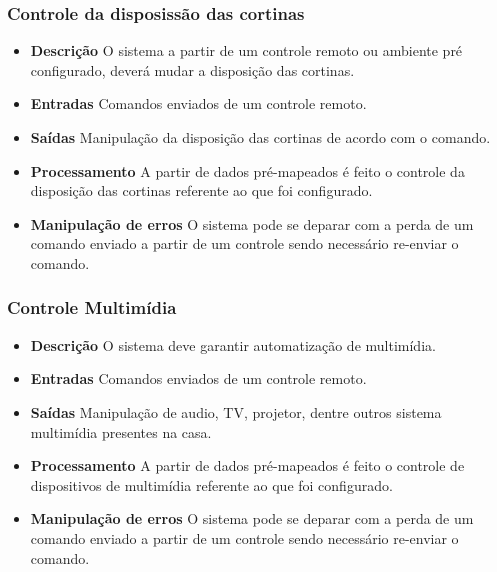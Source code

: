 \subsubsection{Controle da disposissão das cortinas}
\begin{itemize}

	\item \textbf{Descrição}
	O sistema a partir de um controle remoto ou ambiente pré configurado, deverá mudar a disposição das cortinas.

	\item \textbf{Entradas}
    Comandos enviados de um controle remoto.

	\item \textbf{Saídas}
    Manipulação da disposição das cortinas de acordo com o comando.

	\item \textbf{Processamento}
    A partir de dados pré-mapeados é feito o controle da disposição das cortinas referente ao que foi configurado.

	\item \textbf{Manipulação de erros}
	O sistema pode se deparar com a perda de um comando enviado a partir de um controle sendo necessário re-enviar o
	comando.

\end{itemize}

\subsubsection{Controle Multimídia}
\begin{itemize}
	\item \textbf{Descrição}
	O sistema deve garantir automatização de multimídia.

	\item \textbf{Entradas}
    Comandos enviados de um controle remoto.

	\item \textbf{Saídas}
	    Manipulação de audio, TV, projetor, dentre outros sistema multimídia presentes na casa.

	\item \textbf{Processamento}
	A partir de dados pré-mapeados é feito o controle de dispositivos de multimídia referente ao que foi configurado.

	\item \textbf{Manipulação de erros}
	O sistema pode se deparar com a perda de um comando enviado a partir de um controle sendo necessário re-enviar o
	comando.

\end{itemize}

